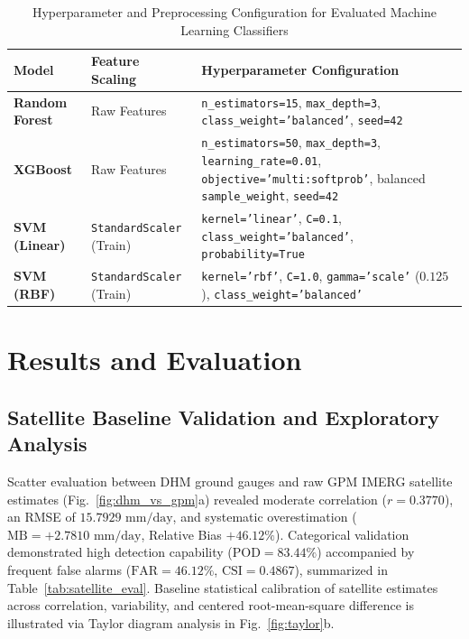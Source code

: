 \documentclass[conference]{IEEEtran}
\begin{document}
\begin{table}[!tbp]
\centering
\caption{Hyperparameter and Preprocessing Configuration for Evaluated Machine Learning Classifiers}
\label{tab:hyperparameters}
\vspace{3pt}
{\footnotesize
\renewcommand{\arraystretch}{1.18}\setlength{\tabcolsep}{4.0pt}%
\begin{tabularx}{\textwidth}{|p{3.0cm}|p{3.5cm}|X|}
\hline
\textbf{Model} & \textbf{Feature Scaling} & \textbf{Hyperparameter Configuration} \\ \hline
\textbf{Random Forest} & Raw Features & \texttt{n\_estimators=15}, \texttt{max\_depth=3}, \texttt{class\_weight='balanced'}, \texttt{seed=42} \\ \hline
\textbf{XGBoost} & Raw Features & \texttt{n\_estimators=50}, \texttt{max\_depth=3}, \texttt{learning\_rate=0.01}, \texttt{objective='multi:softprob'}, balanced \texttt{sample\_weight}, \texttt{seed=42} \\ \hline
\textbf{SVM (Linear)} & \texttt{StandardScaler} (Train) & \texttt{kernel='linear'}, \texttt{C=0.1}, \texttt{class\_weight='balanced'}, \texttt{probability=True} \\ \hline
\textbf{SVM (RBF)} & \texttt{StandardScaler} (Train) & \texttt{kernel='rbf'}, \texttt{C=1.0}, \texttt{gamma='scale'} ($0.125$), \texttt{class\_weight='balanced'} \\
\hline
\end{tabularx}%
}
\end{table}

\section{Results and Evaluation}
\label{sec:results}

\subsection{Satellite Baseline Validation and Exploratory Analysis}
Scatter evaluation between DHM ground gauges and raw GPM IMERG satellite estimates (Fig.~\ref{fig:dhm_vs_gpm}a) revealed moderate correlation ($r = 0.3770$), an RMSE of $15.7929\text{ mm/day}$, and systematic overestimation ($\text{MB} = +2.7810\text{ mm/day}$, Relative Bias $+46.12\%$). Categorical validation demonstrated high detection capability ($\text{POD} = 83.44\%$) accompanied by frequent false alarms ($\text{FAR} = 46.12\%$, $\text{CSI} = 0.4867$), summarized in Table~\ref{tab:satellite_eval}. Baseline statistical calibration of satellite estimates across correlation, variability, and centered root-mean-square difference is illustrated via Taylor diagram analysis in Fig.~\ref{fig:taylor}b.
\end{document}
